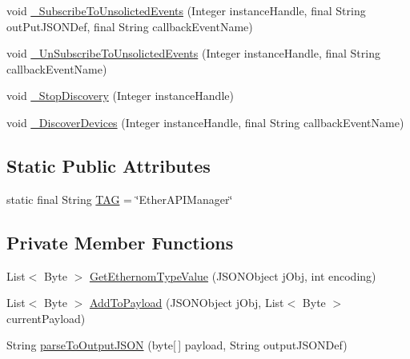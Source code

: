 \begin{DoxyCompactItemize}
\item 
void \mbox{\hyperlink{classcom_1_1ethernom_1_1android_1_1etherapi_1_1_ether_a_p_i_manager_a1a142394e06213d21483ed176cd44bea}{\+\_\+\+Subscribe\+To\+Unsolicted\+Events}} (Integer instance\+Handle, final String out\+Put\+J\+S\+O\+N\+Def, final String callback\+Event\+Name)
\item 
void \mbox{\hyperlink{classcom_1_1ethernom_1_1android_1_1etherapi_1_1_ether_a_p_i_manager_a713f2b3b4f67a096d81f190e1d27f1e7}{\+\_\+\+Un\+Subscribe\+To\+Unsolicted\+Events}} (Integer instance\+Handle, final String callback\+Event\+Name)
\item 
void \mbox{\hyperlink{classcom_1_1ethernom_1_1android_1_1etherapi_1_1_ether_a_p_i_manager_af562559c5169777efdcb24b604a73a13}{\+\_\+\+Stop\+Discovery}} (Integer instance\+Handle)
\item 
void \mbox{\hyperlink{classcom_1_1ethernom_1_1android_1_1etherapi_1_1_ether_a_p_i_manager_a69b7979615788985439523c1ee64662a}{\+\_\+\+Discover\+Devices}} (Integer instance\+Handle, final String callback\+Event\+Name)
\end{DoxyCompactItemize}
\subsection*{Static Public Attributes}
\begin{DoxyCompactItemize}
\item 
static final String \mbox{\hyperlink{classcom_1_1ethernom_1_1android_1_1etherapi_1_1_ether_a_p_i_manager_a7f8b87be936c8707a5307d285c393892}{T\+AG}} = \char`\"{}Ether\+A\+P\+I\+Manager\char`\"{}
\end{DoxyCompactItemize}
\subsection*{Private Member Functions}
\begin{DoxyCompactItemize}
\item 
List$<$ Byte $>$ \mbox{\hyperlink{classcom_1_1ethernom_1_1android_1_1etherapi_1_1_ether_a_p_i_manager_ab888c8e041fe1ed3e6aabf931aa2cb57}{Get\+Ethernom\+Type\+Value}} (J\+S\+O\+N\+Object j\+Obj, int encoding)
\item 
List$<$ Byte $>$ \mbox{\hyperlink{classcom_1_1ethernom_1_1android_1_1etherapi_1_1_ether_a_p_i_manager_aea87690e440c3985866b3e9a4340c930}{Add\+To\+Payload}} (J\+S\+O\+N\+Object j\+Obj, List$<$ Byte $>$current\+Payload)
\item 
String \mbox{\hyperlink{classcom_1_1ethernom_1_1android_1_1etherapi_1_1_ether_a_p_i_manager_a6c1c984afa4e13272013e7062177cd24}{parse\+To\+Output\+J\+S\+ON}} (byte\mbox{[}$\,$\mbox{]} payload, String output\+J\+S\+O\+N\+Def)
\end{DoxyCompactItemize}
